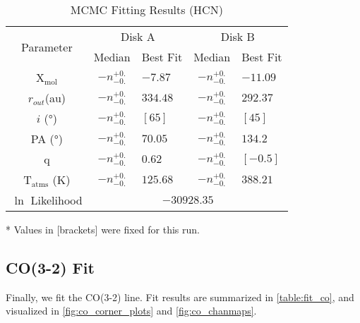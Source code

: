\begin{table}
  \begin{threeparttable}
    \centering
    \caption{MCMC Fitting Results (HCN)}
    \label{table:fit_hcn}
    \renewcommand{\arraystretch}{1.2}
    \begin{tabular}{c c l c l }
      \toprule \toprule
      \multirow{2}{*}{Parameter} & \multicolumn{2}{c}{Disk A} & \multicolumn{2}{c}{Disk B} \\
                                 & Median & Best Fit          & Median & Best Fit \\
      \midrule %
      X$_\text{mol}$             & $ -n _{-0.} ^{+0.}$ & $-7.87$    & $ -n _{-0.} ^{+0.}$ & $-11.09$ \\
      $r_{out}$(\si{au})        & $ -n _{-0.} ^{+0.}$ & $334.48$    & $ -n _{-0.} ^{+0.}$  & $292.37$    \\
      $i$ (\si{\degree})        & $ -n _{-0.} ^{+0.}$ & $[65]$   & $ -n _{-0.} ^{+0.}$ & $[45]$    \\
      PA  (\si{\degree})        & $ -n _{-0.} ^{+0.}$ & $70.05$  & $ -n _{-0.} ^{+0.}$  & $134.2$  \\
      q                         & $ -n _{-0.} ^{+0.}$ & $0.62$  & $ -n _{-0.} ^{+0.}$  & $[-0.5]$  \\
      T$_\text{atms}$ (\si{\K}) & $ -n _{-0.} ^{+0.}$ & $125.68 $  & $ -n _{-0.} ^{+0.}$  & $388.21$  \\
      $\ln$ Likelihood          & \multicolumn{4}{c}{$-30928.35$} \\
      \bottomrule
    \end{tabular}
    \begin{tablenotes}\footnotesize
      \item[*] Values in [brackets] were fixed for this run.
    \end{tablenotes}
  \end{threeparttable}
\end{table}





\subsection{CO(3-2) Fit}

Finally, we fit the CO(3-2) line. Fit results are summarized in \ref{table:fit_co}, and visualized in \ref{fig:co_corner_plots} and \ref{fig:co_chanmaps}.


